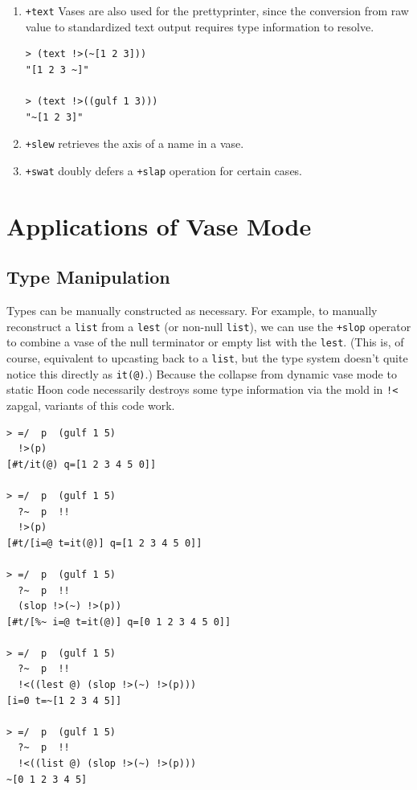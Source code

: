 \documentclass[twoside]{article}
\begin{document}
\begin{enumerate}
  \item  \lstinline[style=inlinecode]{+text} Vases are also used for the prettyprinter, since the conversion from raw value to standardized text output requires type information to resolve.

\begin{lstlisting}[style=listingcode]
> (text !>(~[1 2 3]))
"[1 2 3 ~]"

> (text !>((gulf 1 3)))
"~[1 2 3]"
\end{lstlisting}

  \item  \lstinline[style=inlinecode]{+slew} retrieves the axis of a name in a vase.

  \item  \lstinline[style=inlinecode]{+swat} doubly defers a \lstinline[style=inlinecode]{+slap} operation for certain cases.

\end{enumerate}

\section{Applications of Vase Mode}

\subsection{Type Manipulation}

Types can be manually constructed as necessary.  For example, to manually reconstruct a \lstinline[style=inlinecode]{list} from a \lstinline[style=inlinecode]{lest} (or non-null \lstinline[style=inlinecode]{list}), we can use the \lstinline[style=inlinecode]{+slop} operator to combine a vase of the null terminator or empty list with the \lstinline[style=inlinecode]{lest}.  (This is, of course, equivalent to upcasting back to a \lstinline[style=inlinecode]{list}, but the type system doesn't quite notice this directly as \texttt{it(@)}.)  Because the collapse from dynamic vase mode to static Hoon code necessarily destroys some type information via the mold in \lstinline[style=inlinecode]{!<} zapgal, variants of this code work.

\begin{lstlisting}[style=listingcode]
> =/  p  (gulf 1 5)
  !>(p)
[#t/it(@) q=[1 2 3 4 5 0]]

> =/  p  (gulf 1 5)
  ?~  p  !!
  !>(p)
[#t/[i=@ t=it(@)] q=[1 2 3 4 5 0]]

> =/  p  (gulf 1 5)
  ?~  p  !!
  (slop !>(~) !>(p))
[#t/[%~ i=@ t=it(@)] q=[0 1 2 3 4 5 0]]

> =/  p  (gulf 1 5)
  ?~  p  !!
  !<((lest @) (slop !>(~) !>(p)))
[i=0 t=~[1 2 3 4 5]]

> =/  p  (gulf 1 5)
  ?~  p  !!
  !<((list @) (slop !>(~) !>(p)))
~[0 1 2 3 4 5]
\end{lstlisting}
\end{document}
